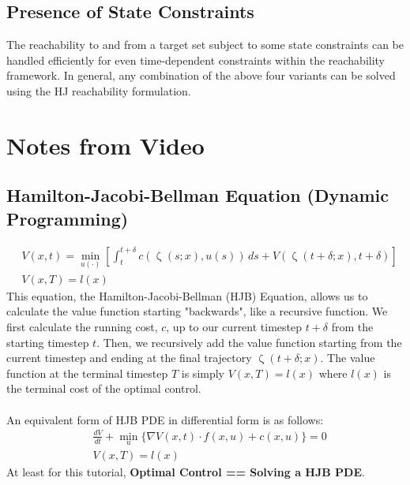 \documentclass{article}
\begin{document}
\subsection{Presence of State Constraints}
The reachability to and from a target set subject to some state constraints can be handled efficiently for even time-dependent constraints within the reachability framework. In general, any combination of the above four variants can be solved using the HJ reachability formulation.

\newpage
\section{Notes from Video}

\subsection{Hamilton-Jacobi-Bellman Equation (Dynamic Programming)} 
\begin{equation}
    \begin{aligned}
        & V(x,t) = \min_{u(\cdot)}\left[ \int_{t}^{t + \delta} c(\upzeta (s;x), u(s)) \, ds + V(\upzeta(t + \delta; x), t + \delta) \right] \\
        & V(x,T) = l(x)
    \end{aligned}
\end{equation}
This equation, the Hamilton-Jacobi-Bellman (HJB) Equation, allows us to calculate the value function starting "backwards", like a recursive function. We first calculate the running cost, $c$, up to our current timestep $t+\delta$ from the starting timestep $t$. Then, we recursively add the value function starting from the current timestep and ending at the final trajectory $\upzeta(t + \delta; x)$. The value function at the terminal timestep $T$ is simply $V(x,T) = l(x)$ where $l(x)$ is the terminal cost of the optimal control.
\\
\\
An equivalent form of HJB PDE in differential form is as follows:
\begin{equation}
    \begin{aligned}
    & \frac{dV}{dt} + \min_{u} \{ \nabla V(x,t) \cdot f(x,u) + c(x,u) \} = 0 \\
    & V(x,T) = l(x)
    \end{aligned}
\end{equation}
At least for this tutorial, \textbf{Optimal Control == Solving a HJB PDE}.
\end{document}
